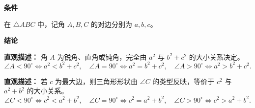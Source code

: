\begin{statementbox}
	\textbf{\textcolor{CStatement}{条件}}
	\begin{description}[style=nextline, leftmargin=2.8em, labelsep=0.5em, itemsep=0.35em]
		\item[\textbf{\textcolor{CStatement}{条件 1（边角对应）：}}]
			在 $\triangle ABC$ 中，记角 $A,B,C$ 的对边分别为 $a,b,c$。
	\end{description}
	\textbf{\textcolor{CStatement}{结论}}
	\begin{description}[style=nextline, leftmargin=2.8em, labelsep=0.5em, itemsep=0.45em]
		\item[\textbf{\textcolor{CStatement}{结论一（锐直钝判据）：}}]
			\textbf{\textcolor{CStatement}{直观描述：}}
			角 $A$ 为锐角、直角或钝角，完全由 $a^2$ 与 $b^2+c^2$ 的大小关系决定。
			\[
				\angle A<90^\circ \iff a^2<b^2+c^2,\quad \angle A=90^\circ \iff a^2=b^2+c^2,\quad \angle A>90^\circ \iff a^2>b^2+c^2.
			\]
		\item[\textbf{\textcolor{CStatement}{推广结论（最大边法）：}}]
			\textbf{\textcolor{CStatement}{直观描述：}}
			若 $c$ 为最大边，则三角形形状由 $\angle C$ 的类型反映，等价于 $c^2$ 与 $a^2+b^2$ 的大小关系。
			\[
				\angle C<90^\circ \iff c^2<a^2+b^2,\quad \angle C=90^\circ \iff c^2=a^2+b^2,\quad \angle C>90^\circ \iff c^2>a^2+b^2.
			\]
	\end{description}

\end{statementbox}
